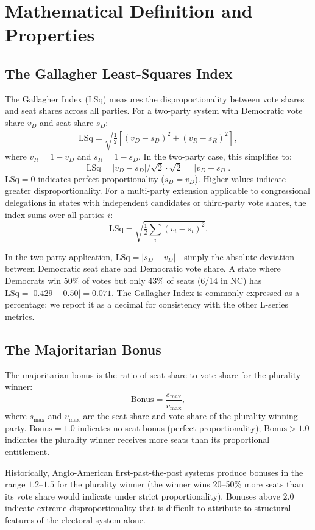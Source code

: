 \section{Mathematical Definition and Properties}
\label{sec:definition}

\subsection{The Gallagher Least-Squares Index}

The Gallagher Index ($\text{LSq}$) measures the disproportionality between
vote shares and seat shares across all parties. For a two-party system with
Democratic vote share $v_D$ and seat share $s_D$:
\[
\text{LSq} = \sqrt{\tfrac{1}{2}\left[(v_D - s_D)^2 + (v_R - s_R)^2\right]},
\]
where $v_R = 1 - v_D$ and $s_R = 1 - s_D$. In the two-party case, this simplifies to:
\[
\text{LSq} = |v_D - s_D| / \sqrt{2} \cdot \sqrt{2} = |v_D - s_D|.
\]
$\text{LSq} = 0$ indicates perfect proportionality ($s_D = v_D$). Higher values
indicate greater disproportionality. For a multi-party extension applicable to
congressional delegations in states with independent candidates or third-party
vote shares, the index sums over all parties $i$:
\[
\text{LSq} = \sqrt{\tfrac{1}{2}\sum_i (v_i - s_i)^2}.
\]

In the two-party application, $\text{LSq} = |s_D - v_D|$---simply the absolute
deviation between Democratic seat share and Democratic vote share. A state where
Democrats win 50\% of votes but only 43\% of seats (6/14 in NC) has
$\text{LSq} = |0.429 - 0.50| = 0.071$. The Gallagher Index is commonly expressed
as a percentage; we report it as a decimal for consistency with the other L-series metrics.

\subsection{The Majoritarian Bonus}

The majoritarian bonus is the ratio of seat share to vote share for the plurality winner:
\[
\text{Bonus} = \frac{s_{\max}}{v_{\max}},
\]
where $s_{\max}$ and $v_{\max}$ are the seat share and vote share of the plurality-winning party.
$\text{Bonus} = 1.0$ indicates no seat bonus (perfect proportionality); $\text{Bonus} > 1.0$
indicates the plurality winner receives more seats than its proportional entitlement.

Historically, Anglo-American first-past-the-post systems produce bonuses in the range
$1.2$--$1.5$ for the plurality winner (the winner wins 20--50\% more seats than its vote
share would indicate under strict proportionality). Bonuses above $2.0$ indicate extreme
disproportionality that is difficult to attribute to structural features of the electoral
system alone.

